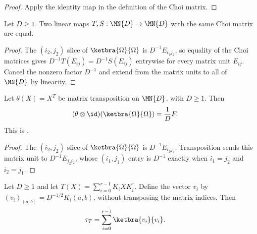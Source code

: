 \begin{proof}\leanok
    Apply the identity map in the definition of the Choi matrix.
\end{proof}

\begin{lemma}\label{lem:choi_matrix_injective}
    \leanok
    Let $D\geq1$. Two linear maps $T,S:\MN{D}\to\MN{D}$ with the same Choi
    matrix are equal.
\end{lemma}

\begin{proof}\leanok
    The $(i_2,j_2)$ slice of $\ketbra{\Omega}{\Omega}$ is $D^{-1}E_{i_2j_2}$,
    so equality of the Choi matrices gives
    $D^{-1}T(E_{ij})=D^{-1}S(E_{ij})$ entrywise for every matrix unit
    $E_{ij}$. Cancel the nonzero factor $D^{-1}$ and extend from the matrix
    units to all of $\MN{D}$ by linearity.
\end{proof}

\begin{theorem}\label{thm:choi_transpose_flip}
    \leanok
    Let $\theta(X)=X^T$ be matrix transposition on $\MN{D}$, with $D \ge 1$.
    Then
    \begin{align}
        (\theta\otimes\id)(\ketbra{\Omega}{\Omega})
        &= \frac{1}{D}F.
        \label{eq:representations_transpose_choi}
    \end{align}
    This is \cite[Equation~3.1]{Wolf2012Quantum}.
\end{theorem}

\begin{proof}\leanok
    The $(i_2,j_2)$ slice of $\ketbra{\Omega}{\Omega}$ is
    $D^{-1}E_{i_2j_2}$. Transposition sends this matrix unit to
    $D^{-1}E_{j_2i_2}$, whose $(i_1,j_1)$ entry is $D^{-1}$ exactly when
    $i_1=j_2$ and $i_2=j_1$.
\end{proof}

\begin{theorem}\label{thm:choi_kraus_outer_product}
    \leanok
    Let $D\geq1$ and let
    $T(X)=\sum_{i=0}^{r-1}K_iXK_i^\dagger$. Define the vector $v_i$ by
    $(v_i)_{(a,b)}=D^{-1/2}K_i(a,b)$, without transposing the matrix indices.
    Then
    \begin{align}
        \tau_T
        &= \sum_{i=0}^{r-1}\ketbra{v_i}{v_i}.
        \label{eq:representations_choi_kraus_outer_product}
    \end{align}
\end{theorem}

